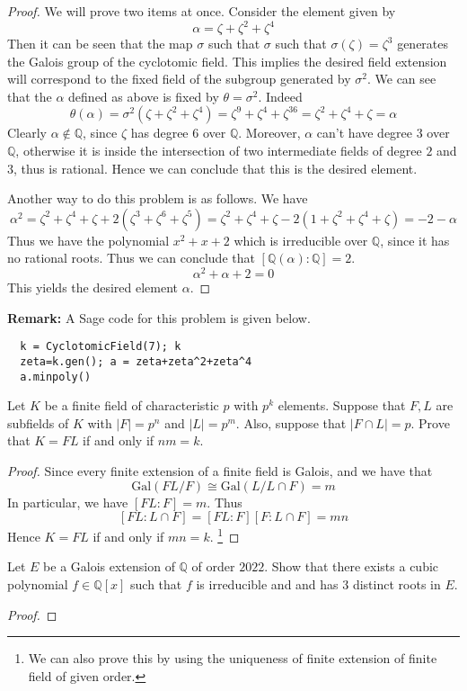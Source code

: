 \documentclass[11pt,letterpaper]{article}
\newcounter{problem}
\DeclareMathOperator{\1}{\mathbbm{1}}
\begin{document}
\begin{proof}
  We will prove two items at once. Consider the element given by
  \[\alpha = \zeta + \zeta^2+\zeta^4\]
  Then it can be seen that the map $\sigma$ such that $\sigma$ such that $\sigma(\zeta) = \zeta^3$ generates the Galois group of the cyclotomic field. This implies the desired field extension will correspond
  to the fixed field of the subgroup generated by $\sigma^2$. We can see that the $\alpha$ defined as above
  is fixed by $\theta=\sigma^2$. Indeed
  \[\theta(\alpha) = \sigma^2(\zeta + \zeta^2+\zeta^4) = \zeta^9 + \zeta^4+\zeta^{36} = \zeta^2 + \zeta^4+\zeta = \alpha\]
  Clearly $\alpha \notin \mathbb{Q}$, since $\zeta$ has degree $6$ over $\mathbb{Q}$. Moreover, $\alpha$ can't have degree $3$ over $\mathbb{Q}$,
  otherwise it is inside the intersection of two intermediate fields of degree $2$ and $3$, thus is rational.
  Hence we can conclude that this is the desired element.

  Another way  to do this problem is as follows. We have
  \[\alpha^2 = \zeta^2+\zeta^4+\zeta + 2(\zeta^3+\zeta^6+\zeta^5)=\zeta^2+\zeta^4+\zeta-2(1+\zeta^2+\zeta^4+\zeta)=-2-\alpha\]
  Thus we have the polynomial $x^2+x+2$ which is irreducible over $\mathbb{Q}$, since it has no rational roots. Thus we can conclude that $[\mathbb{Q}(\alpha):\mathbb{Q}] = 2$.
  \[\alpha^2 + \alpha + 2 = 0\]
  This yields the desired element $\alpha$.
\end{proof}
\textbf{Remark:} A Sage code for this problem is given below.
\begin{verbatim}
  k = CyclotomicField(7); k 
  zeta=k.gen(); a = zeta+zeta^2+zeta^4
  a.minpoly()
\end{verbatim}
\begin{exercise}
  Let \( K \) be a finite field of characteristic \( p \) with \( p^k \) elements. Suppose that \( F, L \) are subfields of \( K \) with \( |F| = p^n \) and \( |L| = p^m \). Also, suppose that \( |F \cap L| = p \). Prove that \( K = FL \) if and only if \( nm = k \).
\end{exercise}
\begin{proof}
  Since every finite extension of a finite field is Galois, and we have that
  \[\text{Gal}(FL/F) \cong \text{Gal}(L/L\cap F) = m\]
  In particular, we have $[FL:F] = m$. Thus
  \[[FL:L \cap F] = [FL:F][F:L\cap F ] = mn\]
  Hence $K = FL$ if and only if $mn = k$.  \footnote{  We can also prove this by using the uniqueness of finite extension of finite field of given order.}
\end{proof}
\begin{exercise}
  Let $E$ be a Galois extension of $\mathbb{Q}$ of order $2022$. Show that there exists 
  a cubic polynomial $f \in \mathbb{Q}[x]$ such that $f$ is irreducible and and has 3 distinct roots in $E$.
\end{exercise}
\begin{proof}
  
\end{proof}
\end{document}
